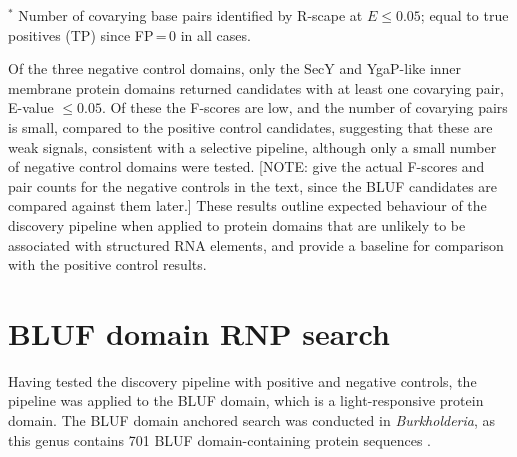 \begin{table}[H]
\centering
\footnotesize
\caption[Negative control candidates]{\textbf{Negative control candidates.}
    The SecY protein translocase (IPR002208, PF00538) and the YgaP-like inner membrane protein (IPR021309, PF03471) were screened in both directions and produced clusters with significant covarying pairs ($E \le 0.05$).
    YadA-like membrane anchor domain (IPR005594, PF03895) was also screened in both directions but produced no clusters with a significant covarying pair.
}
\label{tab:negative_control_candidates}
    

\par\smallskip
\begin{minipage}{\textwidth}
\raggedright
$^{*}$ Number of covarying base pairs identified by R-scape at $E \le 0.05$; equal to true positives (TP) since FP\,=\,0 in all cases.\\
\end{minipage}
\end{table}

Of the three negative control domains, only the SecY and YgaP-like inner membrane protein domains returned candidates with at least one covarying pair, E-value $\leq 0.05$.
Of these the F-scores are low, and the number of covarying pairs is small, compared to the positive control candidates, suggesting that these are weak signals, consistent with a selective pipeline, although only a small number of negative control domains were tested. [NOTE: give the actual F-scores and pair counts for the negative controls in the text, since the BLUF candidates are compared against them later.]
These results outline expected behaviour of the discovery pipeline when applied to protein domains that are unlikely to be associated with structured RNA elements, and provide a baseline for comparison with the positive control results.

\section{\ac{BLUF} domain \ac{RNP} search}

Having tested the discovery pipeline with positive and negative controls, the pipeline was applied to the \ac{BLUF} domain, which is a light-responsive protein domain.
The \ac{BLUF} domain anchored search was conducted in \emph{Burkholderia}, as this genus contains 701 \ac{BLUF} domain-containing protein sequences \citep{Blum2025}.

